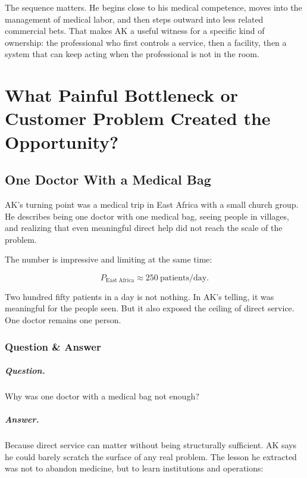 \documentclass[11pt,oneside]{book}
\begin{document}
The sequence matters. He begins close to his medical competence, moves into the management of medical labor, and then steps outward into less related commercial bets. That makes AK a useful witness for a specific kind of ownership: the professional who first controls a service, then a facility, then a system that can keep acting when the professional is not in the room.

\chapter{What Painful Bottleneck or Customer Problem Created the Opportunity?}

\section{One Doctor With a Medical Bag}

AK's turning point was a medical trip in East Africa with a small church group. He describes being one doctor with one medical bag, seeing people in villages, and realizing that even meaningful direct help did not reach the scale of the problem.

The number is impressive and limiting at the same time:

\begin{equation}
P_{\mathrm{East\ Africa}}\approx 250\ \mathrm{patients/day}.
\end{equation}

Two hundred fifty patients in a day is not nothing. In AK's telling, it was meaningful for the people seen. But it also exposed the ceiling of direct service. One doctor remains one person.

\subsection{Question \& Answer}

\paragraph{Question.}
Why was one doctor with a medical bag not enough?

\paragraph{Answer.}
Because direct service can matter without being structurally sufficient. AK says he could barely scratch the surface of any real problem. The lesson he extracted was not to abandon medicine, but to learn institutions and operations:
\end{document}
